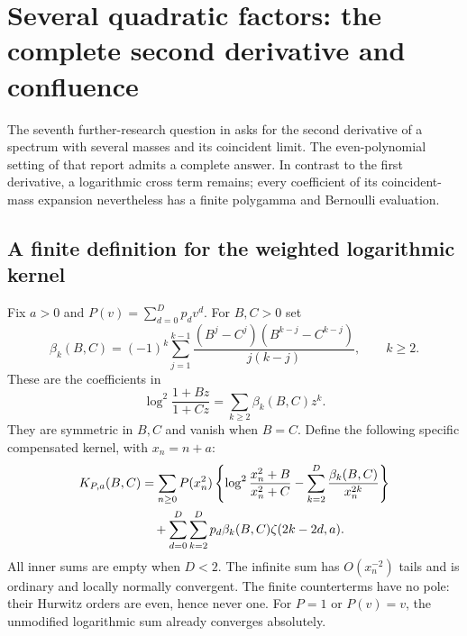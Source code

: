 \section{Several quadratic factors: the complete second derivative and confluence}
\label{mm:section}

The seventh further-research question in \cite{QSpec} asks for the
second derivative of a spectrum with several masses and its coincident
limit.  The even-polynomial setting of that report admits a complete
answer.  In contrast to the first derivative, a logarithmic cross term
remains; every coefficient of its coincident-mass expansion nevertheless
has a finite polygamma and Bernoulli evaluation.

\subsection{A finite definition for the weighted logarithmic kernel}

Fix $a>0$ and $P(v)=\sum_{d=0}^{D}p_dv^d$.  For $B,C>0$ set
\begin{equation}\label{mm:eq:beta}
 \beta_k(B,C)=(-1)^k\sum_{j=1}^{k-1}
        \frac{(B^j-C^j)(B^{k-j}-C^{k-j})}{j(k-j)},\qquad k\ge2.
\end{equation}
These are the coefficients in
\[
 \log^2\frac{1+Bz}{1+Cz}=\sum_{k\ge2}\beta_k(B,C)z^k.
\]
They are symmetric in $B,C$ and vanish when $B=C$.  Define the
following specific compensated kernel, with $x_n=n+a$:
\begin{align}
 K_{P,a}(B,C)
 &=\sum_{n\ge0}P(x_n^2)
    \left\{\log^2\frac{x_n^2+B}{x_n^2+C}
                 -\sum_{k=2}^{D}\frac{\beta_k(B,C)}{x_n^{2k}}\right\}
    \notag\\
 &\quad+\sum_{d=0}^{D}\sum_{k=2}^{D}
              p_d\beta_k(B,C)\zeta(2k-2d,a).
              \label{mm:eq:K}
\end{align}
All inner sums are empty when $D<2$.  The infinite sum has
$O(x_n^{-2})$ tails and is ordinary and locally normally convergent.
The finite counterterms have no pole: their Hurwitz orders are even,
hence never one.  For $P=1$ or $P(v)=v$, the unmodified logarithmic
sum already converges absolutely.

